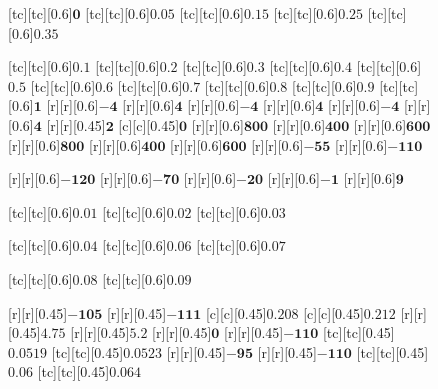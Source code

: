 \documentclass[a4paper, 8pt, twocolumn]{IEEEtran}
\begin{document}
\begin{figure}[htbp]
\def\size{0.6}
\def\sizetwo{0.45}
\centering
{}[tc][tc][\size]{$\bm{0}$}
[tc][tc][\size]{$\bm{0.05}$}
[tc][tc][\size]{$\bm{0.15}$}
[tc][tc][\size]{$\bm{0.25}$}
[tc][tc][\size]{$\bm{0.35}$}

[tc][tc][\size]{$\bm{0.1}$}
[tc][tc][\size]{$\bm{0.2}$}
[tc][tc][\size]{$\bm{0.3}$}
[tc][tc][\size]{$\bm{0.4}$}
[tc][tc][\size]{$\bm{0.5}$}
[tc][tc][\size]{$\bm{0.6}$}
[tc][tc][\size]{$\bm{0.7}$}
[tc][tc][\size]{$\bm{0.8}$}
[tc][tc][\size]{$\bm{0.9}$}
[tc][tc][\size]{$\bm{1}$}
[r][r][\size]{$\bm{-4}$}
[r][r][\size]{$\bm{4}$}
[r][r][\size]{$\bm{-4}$}
[r][r][\size]{$\bm{4}$}
[r][r][\size]{$\bm{-4}$}
[r][r][\size]{$\bm{4}$}
[r][r][\sizetwo]{$\bm{2}$}
[c][c][\sizetwo]{$\bm{0}$}
[r][r][\size]{$\bm{800}$}
[r][r][\size]{$\bm{400}$}
[r][r][\size]{$\bm{600}$}
[r][r][\size]{$\bm{800}$}
[r][r][\size]{$\bm{400}$}
[r][r][\size]{$\bm{600}$}
[r][r][\size]{$\bm{-55}$}
[r][r][\size]{$\bm{-110}$}

[r][r][\size]{$\bm{-120}$}
[r][r][\size]{$\bm{-70}$}
[r][r][\size]{$\bm{-20}$}
[r][r][\size]{$\bm{-1}$}
[r][r][\size]{$\bm{9}$}


[tc][tc][\size]{$\bm{0.01}$}
[tc][tc][\size]{$\bm{0.02}$}
[tc][tc][\size]{$\bm{0.03}$}

[tc][tc][\size]{$\bm{0.04}$}
[tc][tc][\size]{$\bm{0.06}$}
[tc][tc][\size]{$\bm{0.07}$}

[tc][tc][\size]{$\bm{0.08}$}
[tc][tc][\size]{$\bm{0.09}$}


[r][r][\sizetwo]{$\bm{-105}$}
[r][r][\sizetwo]{$\bm{-111}$}
[c][c][\sizetwo]{$\bm{0.208}$}
[c][c][\sizetwo]{$\bm{0.212}$}
[r][r][\sizetwo]{$\bm{4.75}$}
[r][r][\sizetwo]{$\bm{5.2}$}
[r][r][\sizetwo]{$\bm{0}$}
[r][r][\sizetwo]{$\bm{-110}$}
[tc][tc][\sizetwo]{$\bm{0.0519}$}
[tc][tc][\sizetwo]{$\bm{0.0523}$}
[r][r][\sizetwo]{$\bm{-95}$}
[r][r][\sizetwo]{$\bm{-110}$}
[tc][tc][\sizetwo]{$\bm{0.06}$}
[tc][tc][\sizetwo]{$\bm{0.064}$}


\end{figure}
\end{document}
